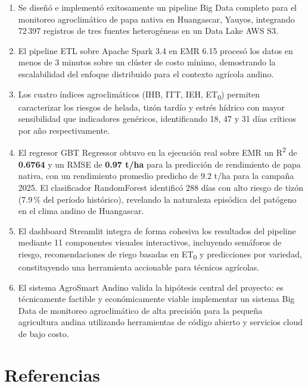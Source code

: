 \documentclass[12pt,a4paper]{article}
\begin{document}
\begin{enumerate}
  \item Se diseñó e implementó exitosamente un pipeline Big Data completo
    para el monitoreo agroclimático de papa nativa en Huangascar, Yauyos,
    integrando 72\,397 registros de tres fuentes heterogéneas en un Data
    Lake AWS S3.

  \item El pipeline ETL sobre Apache Spark 3.4 en EMR 6.15 procesó los
    datos en menos de 3 minutos sobre un clúster de costo mínimo,
    demostrando la escalabilidad del enfoque distribuido para el contexto
    agrícola andino.

  \item Los cuatro índices agroclimáticos (IHB, ITT, IEH, ET\textsubscript{0})
    permiten caracterizar los riesgos de helada, tizón tardío y estrés
    hídrico con mayor sensibilidad que indicadores genéricos,
    identificando 18, 47 y 31 días críticos por año respectivamente.

  \item El regresor GBT Regressor obtuvo en la ejecución real sobre EMR un
    R\textsuperscript{2} de \textbf{0.6764} y un RMSE de \textbf{0.97 t/ha}
    para la predicción de rendimiento de papa nativa, con un rendimiento
    promedio predicho de 9.2 t/ha para la campaña 2025. El clasificador
    RandomForest identificó 288 días con alto riesgo de tizón (7.9\,\%
    del período histórico), revelando la naturaleza episódica del patógeno
    en el clima andino de Huangascar.

  \item El dashboard Streamlit integra de forma cohesiva los resultados
    del pipeline mediante 11 componentes visuales interactivos, incluyendo
    semáforos de riesgo, recomendaciones de riego basadas en
    ET\textsubscript{0} y predicciones por variedad, constituyendo una
    herramienta accionable para técnicos agrícolas.

  \item El sistema AgroSmart Andino valida la hipótesis central del
    proyecto: es técnicamente factible y económicamente viable implementar
    un sistema Big Data de monitoreo agroclimático de alta precisión para
    la pequeña agricultura andina utilizando herramientas de código
    abierto y servicios cloud de bajo costo.
\end{enumerate}

\section*{Referencias}
\end{document}
